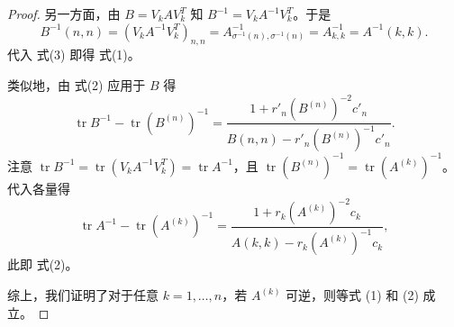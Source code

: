 \begin{proof}
另一方面，由 $B=V_k A V_k^{\!T}$ 知 $B^{-1}=V_k A^{-1} V_k^{\!T}$。于是
\[
B^{-1}(n,n) = (V_k A^{-1} V_k^{\!T})_{n,n} = A^{-1}_{\sigma^{-1}(n),\sigma^{-1}(n)} = A^{-1}_{k,k}=A^{-1}(k,k).
\]
代入 式(3) 即得 式(1)。

类似地，由 式(2) 应用于 $B$ 得
\[
\operatorname{tr}B^{-1}-\operatorname{tr}(B^{(n)})^{-1}= \frac{1+r'_n (B^{(n)})^{-2}c'_n}{B(n,n)-r'_n (B^{(n)})^{-1}c'_n}.
\]
注意 $\operatorname{tr}B^{-1}=\operatorname{tr}(V_k A^{-1} V_k^{\!T})=\operatorname{tr}A^{-1}$，且 $\operatorname{tr}(B^{(n)})^{-1}=\operatorname{tr}(A^{(k)})^{-1}$。代入各量得
\[
\operatorname{tr}A^{-1}-\operatorname{tr}(A^{(k)})^{-1}= \frac{1+r_k (A^{(k)})^{-2}c_k}{A(k,k)-r_k (A^{(k)})^{-1}c_k},
\]
此即 式(2)。

综上，我们证明了对于任意 $k=1,\dots,n$，若 $A^{(k)}$ 可逆，则等式 (1) 和 (2) 成立。
\end{proof}